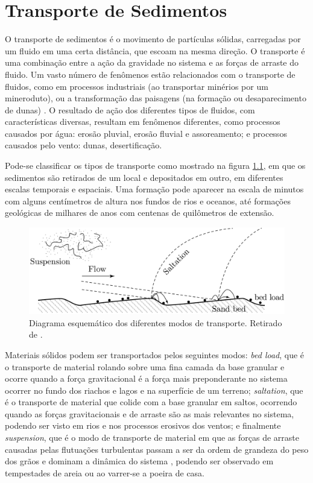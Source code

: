 \chapter{Transporte de Sedimentos}
\label{chap:Transporte-Sedimentos}
    O transporte de sedimentos é o movimento de partículas sólidas, carregadas por um fluido em uma certa distância, que escoam na mesma direção. O transporte é uma combinação entre a ação da gravidade no sistema e as forças de arraste do fluido. Um vasto número de fenômenos estão relacionados com o transporte de fluidos, como em processos industriais (ao transportar minérios por um mineroduto), ou a transformação das paisagens (na formação ou desaparecimento de dunas) \cite{Granular_Media_Between_Fluid_and_Solid}. O resultado de ação dos diferentes tipos de fluidos, com características diversas, resultam em fenômenos diferentes, como processos causados por água: erosão pluvial, erosão fluvial e assoreamento; e processos causados pelo vento: dunas, desertificação.

    Pode-se classificar os tipos de transporte como mostrado na figura \ref{fig:transport_mode}, em que os sedimentos são retirados de um local e depositados em outro, em diferentes escalas temporais e espaciais. Uma formação pode aparecer na escala de minutos com alguns centímetros de altura nos fundos de rios e oceanos, até formações geológicas de milhares de anos com centenas de quilômetros de extensão.

\begin{figure}
    \centering
    \includegraphics[width = 0.75 \textwidth]{04-figuras/TransportModes.png}
    \caption[Modos de transporte]{Diagrama esquemático dos diferentes modos de transporte. Retirado de \cite{Granular_Media_Between_Fluid_and_Solid}. \label{fig:transport_mode}}
\end{figure}

    Materiais sólidos podem ser transportados pelos seguintes modos: \textit{bed load}, que é o transporte de material rolando sobre uma fina camada da base granular e ocorre quando a força gravitacional é a força mais preponderante no sistema \cite{Bedforms_in_a_turbulent_stream} ocorrer no fundo dos riachos e lagos e na superfície de um terreno; \textit{saltation}, que é o transporte de material que colide com a base granular em saltos, ocorrendo quando as forças gravitacionais e de arraste são as mais relevantes no sistema, podendo ser visto em rios e nos processos erosivos dos ventos; e finalmente \textit{suspension}, que é o modo de transporte de material em que as forças de arraste causadas pelas flutuações turbulentas passam a ser da ordem de grandeza do peso dos grãos e dominam a dinâmica do sistema \cite{FVSCS}, podendo ser observado em tempestades de areia ou ao varrer-se a poeira de casa.

